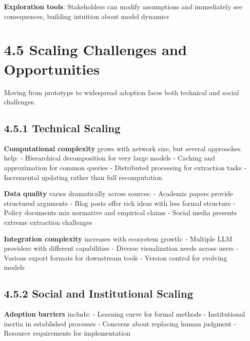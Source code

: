 \documentclass[
  11pt,
  letterpaper,
]{book}
\begin{document}
\textbf{Exploration tools}: Stakeholders can modify assumptions and
immediately see consequences, building intuition about model dynamics

\section*{4.5 Scaling Challenges and Opportunities}\label{sec-scaling}


Moving from prototype to widespread adoption faces both technical and
social challenges.

\subsection*{4.5.1 Technical Scaling}\label{sec-technical-scaling}

\textbf{Computational complexity} grows with network size, but several
approaches help: - Hierarchical decomposition for very large models -
Caching and approximation for common queries - Distributed processing
for extraction tasks - Incremental updating rather than full
recomputation

\textbf{Data quality} varies dramatically across sources: - Academic
papers provide structured arguments - Blog posts offer rich ideas with
less formal structure - Policy documents mix normative and empirical
claims - Social media presents extreme extraction challenges

\textbf{Integration complexity} increases with ecosystem growth: -
Multiple LLM providers with different capabilities - Diverse
visualization needs across users - Various export formats for downstream
tools - Version control for evolving models

\subsection*{4.5.2 Social and Institutional
Scaling}\label{sec-social-scaling}

\textbf{Adoption barriers} include: - Learning curve for formal methods
- Institutional inertia in established processes - Concerns about
replacing human judgment - Resource requirements for implementation
\end{document}
